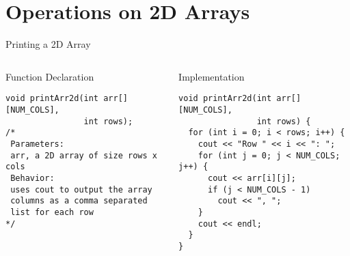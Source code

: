 \documentclass{beamer}
\begin{document}
\section{Operations on 2D Arrays}

\begin{frame}{Printing a 2D Array}
    \begin{columns}
        \begin{column}{0.48\textwidth}
            \begin{block}{Function Declaration}
                \begin{lstlisting}[basicstyle=\ttfamily\footnotesize]
void printArr2d(int arr[][NUM_COLS], 
                int rows);
/*
 Parameters: 
 arr, a 2D array of size rows x cols
 Behavior: 
 uses cout to output the array 
 columns as a comma separated 
 list for each row
*/
                \end{lstlisting}
            \end{block}
        \end{column}
        \begin{column}{0.48\textwidth}
            \begin{block}{Implementation}
                \begin{lstlisting}[basicstyle=\ttfamily\footnotesize]
void printArr2d(int arr[][NUM_COLS], 
                int rows) {
  for (int i = 0; i < rows; i++) {
    cout << "Row " << i << ": ";
    for (int j = 0; j < NUM_COLS; j++) {
      cout << arr[i][j];
      if (j < NUM_COLS - 1) 
        cout << ", ";
    }
    cout << endl;
  }
}
                \end{lstlisting}
            \end{block}
        \end{column}
    \end{columns}
\end{frame}
\end{document}
